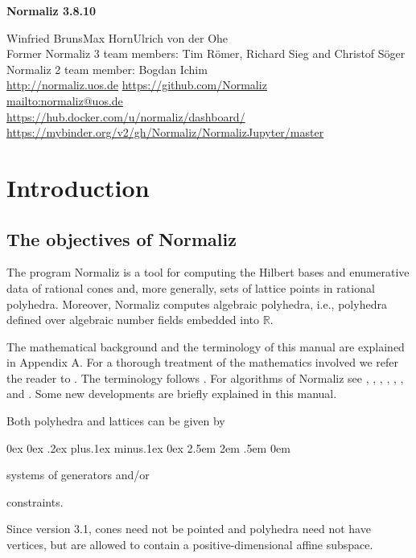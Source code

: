 \documentclass[12pt,a4paper]{scrartcl}
\newcounter{listi}
\newcommand{\stdli}{ \topsep0ex \partopsep0ex %
\parsep.2ex plus.1ex minus.1ex \itemsep0ex%
\leftmargin2.5em \labelwidth2em \labelsep.5em \rightmargin0em}%
\newenvironment{arab}{\begin{list}{\textup{(\arabic{listi})}}%
	{\usecounter{listi}\stdli}}{\end{list}}
\theoremstyle{definition}
\def\RR{{\mathbb R}}
\def\version{3.8.10}
\begin{document}
\vspace*{2cm}

\centerline{\Large\textbf{Normaliz \version}}

\vspace*{1.5cm}

\begin{center}Winfried Bruns\qquad Max Horn\qquad Ulrich von der Ohe\\[14pt]
	Former Normaliz 3 team members:  Tim R\"omer, Richard Sieg and Christof S\"oger\\[14pt]
	Normaliz 2 team member: Bogdan Ichim\\[14pt]
	\url{http://normaliz.uos.de}\qquad\qquad\qquad
	\url{https://github.com/Normaliz}\\[14pt]
	\url{mailto:normaliz@uos.de}\\[14pt]
	\url{https://hub.docker.com/u/normaliz/dashboard/}\\[14pt] 
	\url{https://mybinder.org/v2/gh/Normaliz/NormalizJupyter/master}
\end{center}



\tableofcontents

\newpage

\section{Introduction}\label{facil}

\subsection{The objectives of Normaliz}

The program Normaliz  is a tool for computing
the Hilbert bases and enumerative data of rational cones and, more generally, sets of lattice points in rational polyhedra. Moreover, Normaliz computes algebraic polyhedra, i.e., polyhedra defined over algebraic number fields embedded into $\RR$.

The mathematical background and the terminology of this manual are explained in Appendix A. For a thorough treatment of the  mathematics involved we refer the reader to
\cite{BG}. The terminology follows \cite{BG}. For
algorithms of Normaliz see  \cite{BHIKS},  \cite{BI}, \cite{BI2},
\cite{BIS},  \cite{BK02}, \cite{BSS}, and \cite{BS}. Some new developments are briefly explained in this manual.

Both polyhedra and lattices  can be given by
\begin{arab}
	\item systems of generators and/or
	\item constraints.
\end{arab}
Since version 3.1, cones need not be pointed and polyhedra need not have vertices, but are allowed to contain a positive-dimensional affine subspace.
\end{document}
